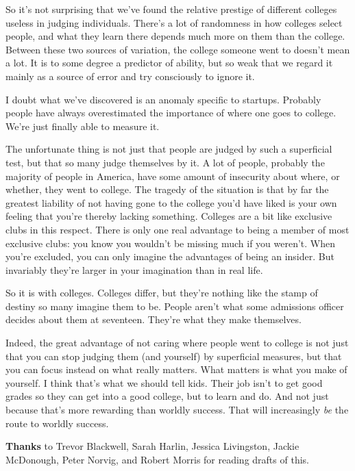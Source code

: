 So it's not surprising that we've found the relative prestige of
different colleges useless in judging individuals. There's a lot of
randomness in how colleges select people, and what they learn there
depends much more on them than the college. Between these two sources of
variation, the college someone went to doesn't mean a lot. It is to some
degree a predictor of ability, but so weak that we regard it mainly as a
source of error and try consciously to ignore it.

I doubt what we've discovered is an anomaly specific to startups.
Probably people have always overestimated the importance of where one
goes to college. We're just finally able to measure it.

The unfortunate thing is not just that people are judged by such a
superficial test, but that so many judge themselves by it. A lot of
people, probably the majority of people in America, have some amount of
insecurity about where, or whether, they went to college. The tragedy of
the situation is that by far the greatest liability of not having gone
to the college you'd have liked is your own feeling that you're thereby
lacking something. Colleges are a bit like exclusive clubs in this
respect. There is only one real advantage to being a member of most
exclusive clubs: you know you wouldn't be missing much if you weren't.
When you're excluded, you can only imagine the advantages of being an
insider. But invariably they're larger in your imagination than in real
life.

So it is with colleges. Colleges differ, but they're nothing like the
stamp of destiny so many imagine them to be. People aren't what some
admissions officer decides about them at seventeen. They're what they
make themselves.

Indeed, the great advantage of not caring where people went to college
is not just that you can stop judging them (and yourself) by superficial
measures, but that you can focus instead on what really matters. What
matters is what you make of yourself. I think that's what we should tell
kids. Their job isn't to get good grades so they can get into a good
college, but to learn and do. And not just because that's more rewarding
than worldly success. That will increasingly \emph{be} the route to
worldly success.


\textbf{Thanks} to Trevor Blackwell, Sarah Harlin, Jessica Livingston,
Jackie McDonough, Peter Norvig, and Robert Morris for reading drafts of
this.